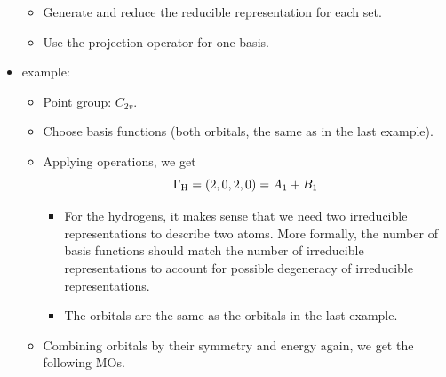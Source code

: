 \documentclass[../notes.tex]{subfiles}
\begin{document}
\begin{itemize}
\begin{itemize}
        \item Generate and reduce the reducible representation for each set.
        \item Use the projection operator for one basis.
    \end{itemize}
    \item {} example:
    \begin{itemize}
        \item Point group: $C_{2v}$.
        \item Choose basis functions (both  orbitals,  the same as  in the last example).
        \item Applying operations, we get
        \begin{equation*}
            \Gamma_{\ce{H}} = (2,0,2,0) = A_1+B_1
        \end{equation*}
        \begin{itemize}
            \item For the hydrogens, it makes sense that we need two irreducible representations to describe two atoms. More formally, the number of basis functions should match the number of irreducible representations to account for possible degeneracy of irreducible representations.
            \item The  orbitals are the same as the  orbitals in the last example.
        \end{itemize}
        \item Combining orbitals by their symmetry and energy again, we get the following MOs.
        \begin{figure}[H]
            \centering
\end{figure}
\end{itemize}
\end{itemize}
\end{document}
